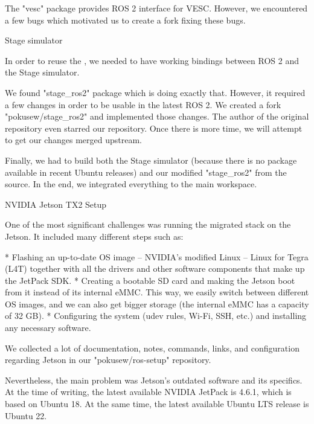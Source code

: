 The "vesc" package provides ROS 2 interface for VESC. However, we encountered a few bugs which motivated us to create a fork fixing these bugs.


\secc Stage simulator

In order to reuse the , we needed to have working bindings between ROS 2 and the Stage simulator.

We found "stage_ros2" package which is doing exactly that. However, it required a few changes in order to be usable in the latest ROS 2. We created a fork "pokusew/stage_ros2" and implemented those changes. The author of the original repository even starred our repository. Once there is more time, we will attempt to get our changes merged upstream.

Finally, we had to build both the Stage simulator (because there is no package available in recent Ubuntu releases) and our modified "stage_ros2" from the source. In the end, we integrated everything to the main workspace.

\vfill

\secc NVIDIA Jetson TX2 Setup

One of the most significant challenges was running the migrated stack on the Jetson. It included many different steps such as:

\begitems
* Flashing an up-to-date OS image – NVIDIA's modified Linux – Linux for Tegra (L4T) together with all the drivers and other software components that make up the JetPack SDK.
* Creating a bootable SD card and making the Jetson boot from it instead of its internal eMMC. This way, we easily switch between different OS images, and we can also get bigger storage (the internal eMMC has a capacity of 32 GB).
* Configuring the system (udev rules, Wi-Fi, SSH, etc.) and installing any necessary software.
\enditems

We collected a lot of documentation, notes, commands, links, and configuration regarding Jetson in our "pokusew/ros-setup" repository.

Nevertheless, the main problem was Jetson's outdated software and its specifics. At the time of writing, the latest available NVIDIA JetPack is 4.6.1, which is based on Ubuntu 18. At the same time, the latest available Ubuntu LTS release is Ubuntu 22.

